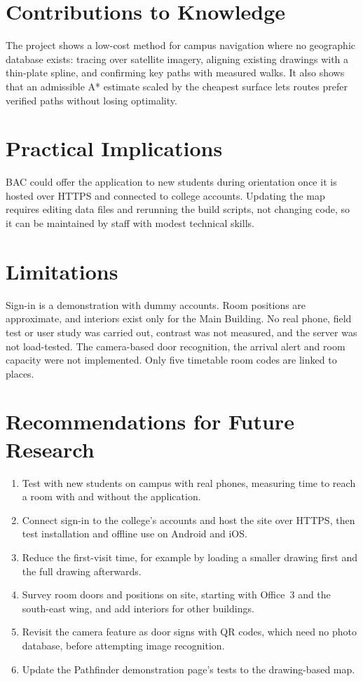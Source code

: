\documentclass[12pt,a4paper]{report}
\begin{document}
\section{Contributions to Knowledge}
The project shows a low-cost method for campus navigation where no geographic database exists: tracing over satellite imagery, aligning existing drawings with a thin-plate spline, and confirming key paths with measured walks. It also shows that an admissible A* estimate scaled by the cheapest surface lets routes prefer verified paths without losing optimality.

\section{Practical Implications}
BAC could offer the application to new students during orientation once it is hosted over HTTPS and connected to college accounts. Updating the map requires editing data files and rerunning the build scripts, not changing code, so it can be maintained by staff with modest technical skills.

\section{Limitations}
Sign-in is a demonstration with dummy accounts. Room positions are approximate, and interiors exist only for the Main Building. No real phone, field test or user study was carried out, contrast was not measured, and the server was not load-tested. The camera-based door recognition, the arrival alert and room capacity were not implemented. Only five timetable room codes are linked to places.

\section{Recommendations for Future Research}
\begin{enumerate}
  \item Test with new students on campus with real phones, measuring time to reach a room with and without the application.
  \item Connect sign-in to the college's accounts and host the site over HTTPS, then test installation and offline use on Android and iOS.
  \item Reduce the first-visit time, for example by loading a smaller drawing first and the full drawing afterwards.
  \item Survey room doors and positions on site, starting with Office~3 and the south-east wing, and add interiors for other buildings.
  \item Revisit the camera feature as door signs with QR codes, which need no photo database, before attempting image recognition.
  \item Update the Pathfinder demonstration page's tests to the drawing-based map.
\end{enumerate}
\end{document}
